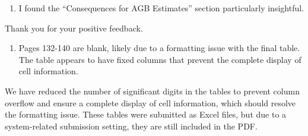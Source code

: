 \documentclass[
  12pt,
  letterpaper,
  DIV=11,
  numbers=noendperiod]{scrartcl}
\providecommand{\tightlist}{%
  \setlength{\itemsep}{0pt}\setlength{\parskip}{0pt}}\usepackage{longtable,booktabs,array}
\renewenvironment{quote}
  {\begin{customblockquote}\color{blockquote-text}\ignorespaces}
  {\end{customblockquote}}
\begin{document}
\begin{quote}
\begin{enumerate}
\def\labelenumi{\arabic{enumi})}
\setcounter{enumi}{3}
\tightlist
\item
  I found the ``Consequences for AGB Estimates'' section particularly
  insightful.
\end{enumerate}
\end{quote}

Thank you for your positive feedback.

\begin{quote}
\begin{enumerate}
\def\labelenumi{\arabic{enumi})}
\setcounter{enumi}{4}
\tightlist
\item
  Pages 132-140 are blank, likely due to a formatting issue with the
  final table. The table appears to have fixed columns that prevent the
  complete display of cell information.
\end{enumerate}
\end{quote}

We have reduced the number of significant digits in the tables to
prevent column overflow and ensure a complete display of cell
information, which should resolve the formatting issue. These tables
were submitted as Excel files, but due to a system-related submission
setting, they are still included in the PDF.
\end{document}

